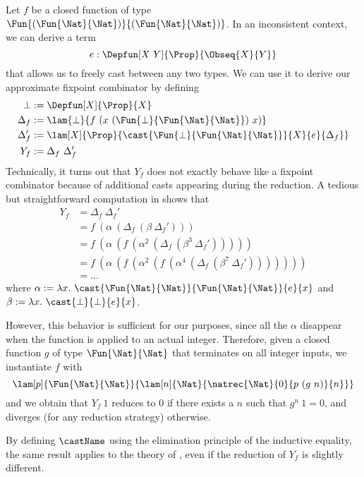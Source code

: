   Let \( f \) be a closed function of type \( \Fun{(\Fun{\Nat}{\Nat})}{(\Fun{\Nat}{\Nat})} \).
  In an inconsistent context, we can derive a term
  \[
     e : \Depfun[X\ Y]{\Prop}{\Obseq{X}{Y}}
  \]
  that allows us to freely cast between any two types.
  We can use it to derive our approximate fixpoint combinator by defining
  \begin{align*}
    \bot &:= \Depfun[X]{\Prop}{X}\\
    \Delta_f &:= \lam{\bot}{f\ (x\ (\Fun{\bot}{\Fun{\Nat}{\Nat}})\ x)}\\
    \Delta_f' &:= \lam[X]{\Prop}{\cast{\Fun{\bot}{\Fun{\Nat}{\Nat}}}{X}{e}{\Delta_f}}\\
    Y_f &:= \Delta_f\ \Delta_f'
  \end{align*}
  Technically, it turns out that \( Y_f \) does not exactly behave like
  a fixpoint combinator because of additional casts appearing during the
  reduction.
  A tedious but straightforward computation in \SetoidCC shows that
  \begin{align*}
    Y_f &= \Delta_f\ \Delta_f'\\
        &= f\ (\alpha\ (\Delta_f\ (\beta\ \Delta_f')))\\
        &= f\ (\alpha\ (f\ (\alpha^2\ (\Delta_f\ (\beta^3\ \Delta_f')))))\\
        &= f\ (\alpha\ (f\ (\alpha^2\ (f\ (\alpha^4\ (\Delta_f\ (\beta^7\ \Delta_f')))))))\\
        &= ...
  \end{align*}
  where \( \alpha := \lambda x.\ {\cast{\Fun{\Nat}{\Nat}}{\Fun{\Nat}{\Nat}}{e}{x}} \)
  and \( \beta := \lambda x.\ {\cast{\bot}{\bot}{e}{x}} \).
  
  However, this behavior is sufficient for our purposes, since all the \( \alpha \) disappear
  when the function is applied to an actual integer.
  Therefore, given a closed function \( g \) of type \( \Fun{\Nat}{\Nat} \) that
  terminates on all integer inputs, we instantiate \( f \) with
  \[
    \lam[p]{\Fun{\Nat}{\Nat}}{\lam[n]{\Nat}{{\natrec{\Nat}{0}{p\ (g\ n)}{n}}}}
  \]
  and we obtain that \( Y_f\ 1 \) reduces to 0 if there exists a \( n \) such that
  \( g^n\ 1 = 0 \), and diverges (for any reduction strategy) otherwise.
  
  
  By defining $\castName$ using the elimination principle of the
  inductive equality, the same result applies to the
  theory of , even if the reduction of $Y_f$ is
  slightly different.
  
